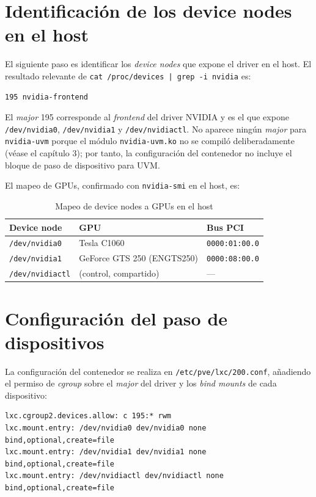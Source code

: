 \section{Identificación de los device nodes en el host}

El siguiente paso es identificar los \textit{device nodes} que expone el driver en el host. El resultado relevante de \texttt{cat /proc/devices | grep -i nvidia} es:

\begin{lstlisting}[style=bash]
195 nvidia-frontend
\end{lstlisting}

El \textit{major} 195 corresponde al \textit{frontend} del driver NVIDIA y es el que expone \texttt{/dev/nvidia0}, \texttt{/dev/nvidia1} y \texttt{/dev/nvidiactl}. No aparece ningún \textit{major} para \texttt{nvidia-uvm} porque el módulo \texttt{nvidia-uvm.ko} no se compiló deliberadamente (véase el capítulo 3); por tanto, la configuración del contenedor no incluye el bloque de paso de dispositivo para UVM.

El mapeo de GPUs, confirmado con \texttt{nvidia-smi} en el host, es:

\begin{table}[htbp]
\centering
\begin{tabular}{|l|l|l|}
\hline
\textbf{Device node} & \textbf{GPU} & \textbf{Bus PCI} \\
\hline
\texttt{/dev/nvidia0} & Tesla C1060 & \texttt{0000:01:00.0} \\
\hline
\texttt{/dev/nvidia1} & GeForce GTS 250 (ENGTS250) & \texttt{0000:08:00.0} \\
\hline
\texttt{/dev/nvidiactl} & (control, compartido) & --- \\
\hline
\end{tabular}
\caption{Mapeo de device nodes a GPUs en el host}
\label{tab:devices}
\end{table}

\section{Configuración del paso de dispositivos}

La configuración del contenedor se realiza en \texttt{/etc/pve/lxc/200.conf}, añadiendo el permiso de \textit{cgroup} sobre el \textit{major} del driver y los \textit{bind mounts} de cada dispositivo:

\begin{lstlisting}[style=bash]
lxc.cgroup2.devices.allow: c 195:* rwm
lxc.mount.entry: /dev/nvidia0 dev/nvidia0 none bind,optional,create=file
lxc.mount.entry: /dev/nvidia1 dev/nvidia1 none bind,optional,create=file
lxc.mount.entry: /dev/nvidiactl dev/nvidiactl none bind,optional,create=file
\end{lstlisting}

